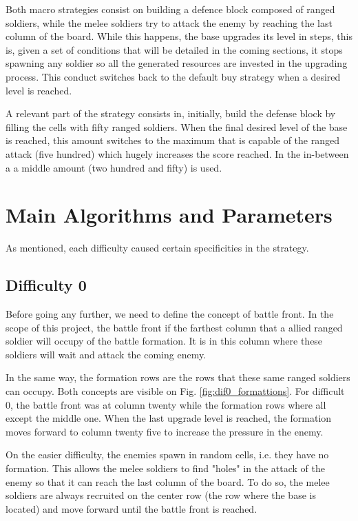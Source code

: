 \documentclass[conference]{IEEEtran}
\begin{document}
Both macro strategies consist on building a defence block composed of ranged soldiers, while the melee soldiers try to attack the enemy by reaching the last column of the board. While this happens, the base upgrades its level in steps, this is, given a set of conditions that will be detailed in the coming sections, it stops spawning any soldier so all the generated resources are invested in the upgrading process. This conduct switches back to the default buy strategy when a desired level is reached.

A relevant part of the strategy consists in, initially, build the defense block by filling the cells with fifty ranged soldiers. When the final desired level of the base is reached, this amount switches to the maximum that is capable of the ranged attack (five hundred) which hugely increases the score reached. In the in-between a a middle amount (two hundred and fifty) is used.

\section{Main Algorithms and Parameters}

As mentioned, each difficulty caused certain specificities in the strategy.

\subsection{Difficulty 0}

Before going any further, we need to define the concept of battle front. In the scope of this project, the battle front if the farthest column that a allied ranged soldier will occupy of the battle formation. It is in this column where these soldiers will wait and attack the coming enemy. 

In the same way, the formation rows are the rows that these same ranged soldiers can occupy. Both concepts are visible on Fig. \ref{fig:dif0_formattions}. For difficult 0, the battle front was at column twenty while the formation rows where all except the middle one. When the last upgrade level is reached, the formation moves forward to column twenty five to increase the pressure in the enemy.

On the easier difficulty, the enemies spawn in random cells, i.e. they have no formation. This allows the melee soldiers to find "holes" in the attack of the enemy so that it can reach the last column of the board. To do so, the melee soldiers are always recruited on the center row (the row where the base is located) and move forward until the battle front is reached.
\end{document}
